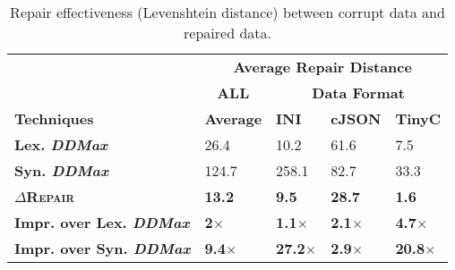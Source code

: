 \documentclass[acmsmall,screen,review,anonymous]{acmart}
\newcommand{\approach}{\textsc{$\Delta$Repair}\xspace}
\newcommand{\ddmax}{\textit{DDMax}\xspace}
\begin{document}

\begin{table}[!tbp]
\caption{Repair effectiveness (Levenshtein distance) between corrupt data and repaired data.}
\begin{tabular}{|p{4.0cm}|p{1.5cm}|p{1.5cm}|p{1.5cm}|p{1.5cm}|}
\hline
 &  \multicolumn{4}{c|}{\textbf{Average Repair Distance}}  \\
&  \multicolumn{1}{c|}{\textbf{ALL}} &   \multicolumn{3}{c|}{\textbf{Data Format}}  \\
\textbf{Techniques} & \textbf{Average}  & \textbf{INI} & \textbf{cJSON} & \textbf{TinyC} \\
\hline
\textbf{Lex. \ddmax} & 26.4 & {10.2} &  61.6 &  7.5 \\
\textbf{Syn. \ddmax} & 124.7 &  258.1 & 82.7 &  33.3 \\
\hline
\textbf{\approach} & \textbf{13.2}  & \textbf{9.5} &  \textbf{28.7} & \textbf{1.6} \\
\hline
\textbf{Impr. over Lex. \ddmax} & \textbf{2$\times$} & \textbf{1.1$\times$} & \textbf{2.1$\times$} & \textbf{4.7$\times$} \\
\textbf{Impr. over Syn. \ddmax} & \textbf{9.4$\times$} & \textbf{27.2$\times$} & \textbf{2.9$\times$} & \textbf{20.8$\times$} \\
\hline
\end{tabular}
\label{tab:datarepairquality}
\end{table}
\end{document}
